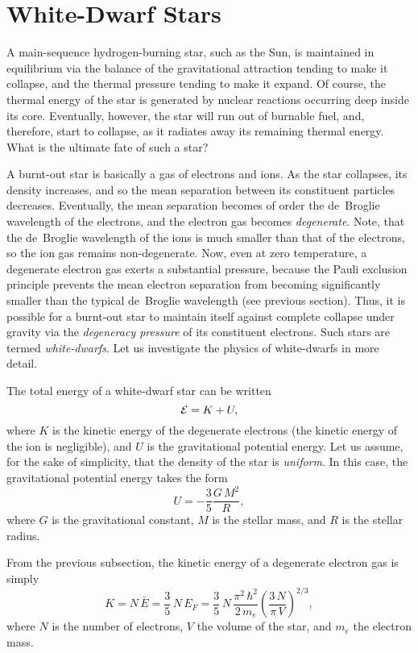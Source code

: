 \section{White-Dwarf Stars}
A main-sequence hydrogen-burning star, such as the Sun, is maintained
in equilibrium via the balance of the gravitational attraction tending
to  make it collapse, and the thermal pressure tending to make it expand. 
Of course, the
thermal energy of the star is generated by nuclear reactions occurring deep inside
its core. Eventually, however, the star will run out of burnable fuel, and, therefore,
start to collapse, as it radiates away its remaining thermal energy.
What is the ultimate fate of such a star?

A burnt-out star is basically a gas of electrons and ions. As the
star collapses, its density increases, and so the mean separation between its
constituent particles decreases. Eventually, the mean separation becomes
of order the de~Broglie wavelength of the electrons, and the electron
gas becomes {\em degenerate}. Note, that the de~Broglie wavelength of the
ions is  much smaller than that of the electrons, so the ion gas remains
non-degenerate. Now, even at
zero temperature, a degenerate electron gas exerts a substantial pressure,
because the Pauli exclusion principle prevents the mean electron separation
from becoming significantly  smaller than the typical 
de~Broglie wavelength (see 
previous section). Thus, it is possible for a burnt-out star to maintain
itself against complete collapse under gravity via the {\em degeneracy pressure}
of its constituent electrons. Such stars are termed {\em white-dwarfs}. 
Let us investigate the physics of white-dwarfs in more detail.

The total energy of a white-dwarf star can be written
\begin{equation}
{\cal E} = K + U,\label{e8wd1}
\end{equation}
where $K$ is the kinetic energy of the degenerate electrons (the kinetic
energy of the ion is negligible), and $U$ is the gravitational potential
energy. Let us assume, for the sake of simplicity, that the density of the
star is {\em uniform}. In this case, the gravitational potential
energy takes the form
\begin{equation}
U = -\frac{3}{5}\frac{G\,M^2}{R},\label{e8wd2}
\end{equation}
where $G$ is the gravitational constant, $M$ is the stellar mass, and $R$ is
the stellar radius.

From the previous subsection, the kinetic energy of a degenerate electron gas is simply
\begin{equation}\label{e8wd4}
K = N\,\bar{E} = \frac{3}{5}\,N\,E_F = \frac{3}{5}\,N\,\frac{\pi^2\,\hbar^2}{2\,m_e}\left(\frac{3\,N}{\pi\,V}\right)^{2/3},
\end{equation}
where $N$ is the number of electrons, $V$ the volume of the star, and $m_e$
the electron mass.

